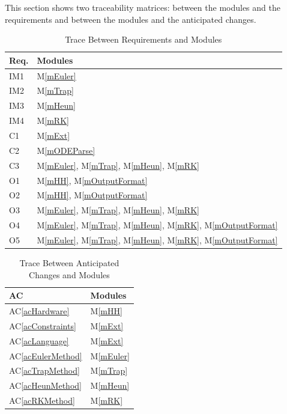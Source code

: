 \documentclass[12pt, titlepage]{article}
\newcommand{\acref}[1]{AC\ref{#1}}
\newcommand{\mref}[1]{M\ref{#1}}
\begin{document}
This section shows two traceability matrices: between the modules and the
requirements and between the modules and the anticipated changes.

\begin{table}[H]
\centering
\begin{tabular}{p{} p{}}
\toprule
\textbf{Req.} & \textbf{Modules}\\
\midrule
IM1 & \mref{mEuler}\\
IM2 & \mref{mTrap}\\
IM3 & \mref{mHeun}\\
IM4 & \mref{mRK}\\
C1 & \mref{mExt}\\
C2 & \mref{mODEParse}\\
C3 & \mref{mEuler}, \mref{mTrap}, \mref{mHeun}, \mref{mRK}\\
O1 & \mref{mHH}, \mref{mOutputFormat}\\
O2 & \mref{mHH}, \mref{mOutputFormat}\\
O3 & \mref{mEuler}, \mref{mTrap}, \mref{mHeun}, \mref{mRK}\\
O4 & \mref{mEuler}, \mref{mTrap}, \mref{mHeun}, \mref{mRK}, \mref{mOutputFormat}\\
O5 & \mref{mEuler}, \mref{mTrap}, \mref{mHeun}, \mref{mRK}, \mref{mOutputFormat}\\
\bottomrule
\end{tabular}
\caption{Trace Between Requirements and Modules}
\label{TblRT}
\end{table}

\begin{table}[H]
\centering
\begin{tabular}{p{} p{}}
\toprule
\textbf{AC} & \textbf{Modules}\\
\midrule
\acref{acHardware} & \mref{mHH}\\
\acref{acConstraints} & \mref{mExt}\\
\acref{acLanguage} & \mref{mExt}\\
\acref{acEulerMethod} & \mref{mEuler}\\
\acref{acTrapMethod} & \mref{mTrap}\\
\acref{acHeunMethod} & \mref{mHeun}\\
\acref{acRKMethod} & \mref{mRK}\\
\bottomrule
\end{tabular}
\caption{Trace Between Anticipated Changes and Modules}
\label{TblACT}
\end{table}
\end{document}
